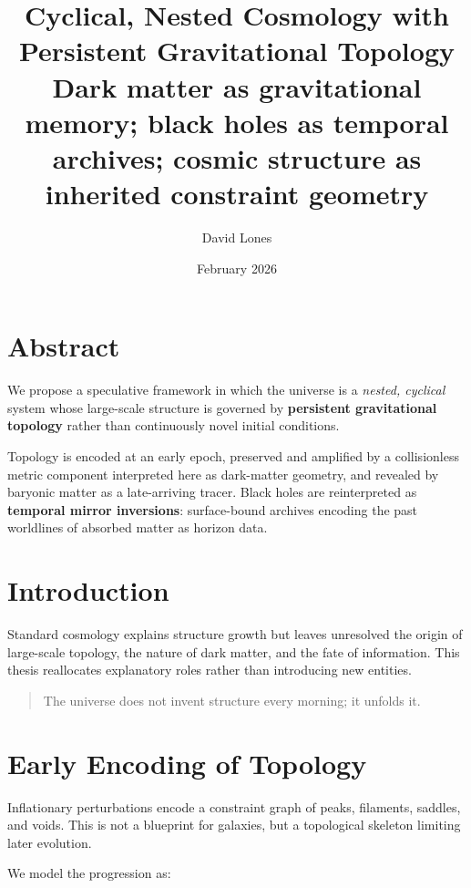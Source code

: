 \documentclass[12pt]{article}
\title{\textbf{Cyclical, Nested Cosmology with Persistent Gravitational Topology}\\
\large Dark matter as gravitational memory; black holes as temporal archives; cosmic structure as inherited constraint geometry}
\author{David Lones}
\date{February 2026}
\begin{document}
\maketitle

\section*{Abstract}

We propose a speculative framework in which the universe is a \emph{nested, cyclical} system whose large-scale structure is governed by \textbf{persistent gravitational topology} rather than continuously novel initial conditions.

Topology is encoded at an early epoch, preserved and amplified by a collisionless metric component interpreted here as dark-matter geometry, and revealed by baryonic matter as a late-arriving tracer. Black holes are reinterpreted as \textbf{temporal mirror inversions}: surface-bound archives encoding the past worldlines of absorbed matter as horizon data.

\section{Introduction}

Standard cosmology explains structure growth but leaves unresolved the origin of large-scale topology, the nature of dark matter, and the fate of information. This thesis reallocates explanatory roles rather than introducing new entities.

\begin{quote}
The universe does not invent structure every morning; it unfolds it.
\end{quote}

\section{Early Encoding of Topology}

Inflationary perturbations encode a constraint graph of peaks, filaments, saddles, and voids. This is not a blueprint for galaxies, but a topological skeleton limiting later evolution.

We model the progression as:

\begin{center}
\end{center}
\end{document}

